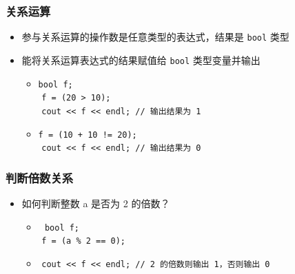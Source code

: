 \begin{frame}[fragile]
    \frametitle{关系运算}

    \begin{itemize}[<+->]
        \item 参与关系运算的操作数是任意类型的表达式，结果是 \lstinline|bool| 类型

        \item 能将关系运算表达式的结果赋值给 \lstinline|bool| 类型变量并输出

            \begin{itemize}
                \item
                    \lstinline|bool f;|\\
                     \lstinline|f = (20 > 10);|\\
                     \lstinline|cout << f << endl; // 输出结果为 1|

                \item
                    \lstinline|f = (10 + 10 != 20);|\\
                     \lstinline|cout << f << endl; // 输出结果为 0|
            \end{itemize}

    \end{itemize}
\end{frame}

\begin{frame}[fragile]
    \frametitle{判断倍数关系}

    \begin{itemize}[<+->]
        \item 如何判断整数 a 是否为 2 的倍数？

            \begin{itemize}
                \item
                     
                    \lstinline|bool f;|\\
                     \lstinline|f = (a % 2 == 0);|\\

                \item
                     \lstinline|cout << f << endl; // 2 的倍数则输出 1，否则输出 0|
            \end{itemize}

    \end{itemize}
\end{frame}

